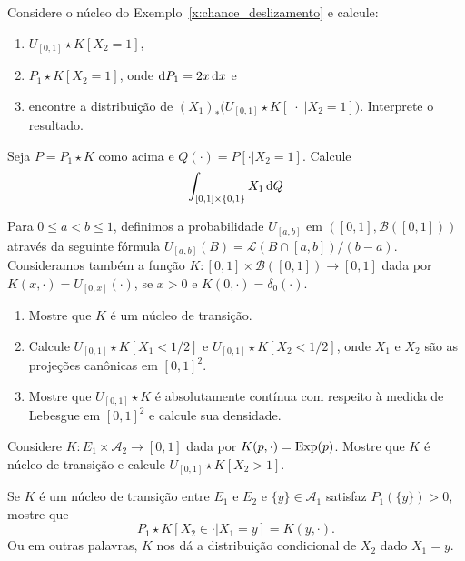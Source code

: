 \begin{exercise}
  Considere o núcleo do Exemplo~\ref{x:chance_deslizamento} e calcule:
  \begin{enumerate}[\quad a)]
  \item $U_{[0,1]} \star K [X_2 = 1]$,
  \item $P_1 \star K [X_2 = 1]$, onde $\mathop{}\!\mathrm{d} P_1 = 2x \mathop{}\!\mathrm{d} x$ e
  \item encontre a distribuição de $(X_1)_* \big( U_{[0,1]} \star K [\; \cdot \; | X_2 = 1] \big)$. Interprete o resultado.
  \end{enumerate}
\end{exercise}

\begin{exercise}
  Seja $P = P_1 \star K$ como acima e $Q(\cdot) = P[\cdot | X_2 = 1]$.
  Calcule
  \begin{equation}
    \int_{[0,1] \times \{0,1\}} X_1 \mathop{}\!\mathrm{d} Q
  \end{equation}
\end{exercise}

\begin{exercise}
  Para $0 \leq a < b \leq 1$, definimos a probabilidade $U_{[a,b]}$ em $([0,1], \mathcal{B}([0,1]))$ através da seguinte fórmula $U_{[a,b]}(B) = \mathcal{L}(B \cap [a,b])/(b-a)$.
  Consideramos também a função $K:[0,1] \times \mathcal{B}([0,1]) \to [0,1]$ dada por $K(x, \cdot) = U_{[0,x]} (\cdot)$, se $x > 0$ e $K(0, \cdot) = \delta_0(\cdot)$.
  \begin{enumerate}[\quad a)]
  \item Mostre que $K$ é um núcleo de transição.
  \item Calcule $U_{[0,1]} \star K [X_1 < 1/2]$ e $U_{[0,1]} \star K [X_2 < 1/2]$, onde $X_1$ e $X_2$ são as projeções canônicas em $[0,1]^2$.
  \item Mostre que $U_{[0,1]} \star K$ é absolutamente contínua com respeito à medida de Lebesgue em $[0,1]^2$ e calcule sua densidade.
\end{enumerate}

\end{exercise}

\begin{exercise}
  Considere $K:E_1 \times \mathcal{A}_2 \to [0,1]$ dada por $K(p, \cdot) = \operatorname{Exp}(p)$.
  Mostre que $K$ é núcleo de transição e calcule $U_{[0,1]} \star K [X_2 > 1]$.
\end{exercise}

\begin{exercise}
  Se $K$ é um núcleo de transição entre $E_1$ e $E_2$ e $\{y\} \in \mathcal{A}_1$ satisfaz $P_1(\{y\}) > 0$, mostre que
  \begin{equation}
    P_1 \star K [X_2 \in \cdot | X_1 = y] = K(y, \cdot).
  \end{equation}
  Ou em outras palavras, $K$ nos dá a distribuição condicional de $X_2$ dado $X_1 = y$.
\end{exercise}

